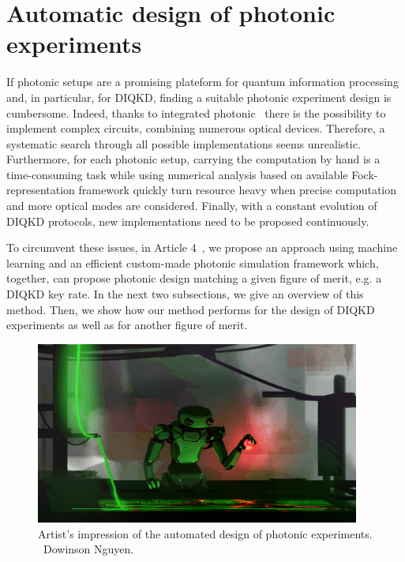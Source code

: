 %

\section{Automatic design of photonic experiments}

If photonic setups are a promising plateform for quantum information processing and, in particular, for DIQKD, finding a suitable photonic experiment design is cumbersome.
Indeed, thanks to integrated photonic~\cite{Pelucchi2021} there is the possibility to implement complex circuits, combining numerous optical devices.
Therefore, a systematic search through all possible implementations seems unrealistic.
Furthermore, for each photonic setup, carrying the computation by hand is a time-consuming task while using numerical analysis based on available Fock-representation framework quickly turn resource heavy when precise computation and more optical modes are considered.
Finally, with a constant evolution of DIQKD protocols, new implementations need to be proposed continuously.

To circumvent these issues, in Article 4~\cite{Valcarce2022b}, we propose an approach using machine learning and an efficient custom-made photonic simulation framework which, together, can propose photonic design matching a given figure of merit, e.g. a DIQKD key rate. 
In the next two subsections, we give an overview of this method.
Then, we show how our method performs for the design of DIQKD experiments as well as for another figure of merit.

\begin{figure}
	\begin{center}
		\includegraphics[width=0.95\textwidth]{chapters/deviceindependent/img/illustration_automated_design.png}
	\end{center}
	\caption{Artist's impression of the automated design of photonic experiments. \textcopyright\, Dowinson Nguyen.}
	\label{fig:}
\end{figure}



